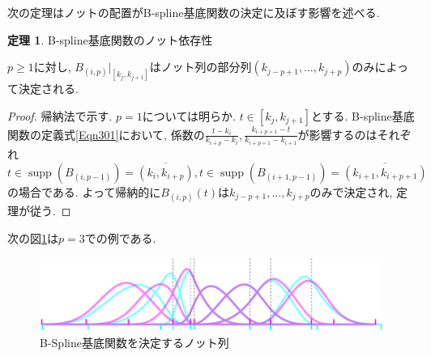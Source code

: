 \documentclass{jsarticle}
\newcommand\Cl[1]{\overline{#1}}
\newcommand\pare[1]{(#1)}
\DeclareMathOperator{\supp}{supp}
\theoremstyle{definition}%
\newtheorem{thm}{定理}
\begin{document}
次の定理はノットの配置がB-spline基底関数の決定に及ぼす影響を述べる.
\begin{screen}
	\begin{thm}
		\label{Thm302}
		B-spline基底関数のノット依存性

		$p\ge 1$に対し, $B_{(i,p)}|_{[k_j,k_{j+1}]}$はノット列の部分列$ \pare{k_{j-p+1}, \dots ,k_{j+p}} $のみによって決定される.
	\end{thm}
\end{screen}
\begin{proof}
    帰納法で示す.
    $p=1$については明らか.
    $t\in [k_{j},k_{j+1}]$とする.
    B-spline基底関数の定義式\eqref{Eqn301}において, 係数の$\frac{t-k_{i}}{k_{i+p}-k_{i}},\frac{k_{i+p+1}-t}{k_{i+p+1}-k_{i+1}}$が影響するのはそれぞれ$t\in \supp(B_{(i,p-1)})=\Cl{(k_{i},k_{i+p})}, t\in \supp(B_{(i+1,p-1)})=\Cl{(k_{i+1},k_{i+p+1})}$の場合である.
    よって帰納的に$B_{(i,p)}(t)$は$k_{j-p+1},\dots,k_{j+p}$のみで決定され, 定理が従う.
\end{proof}
次の図\ref{Fig303}は$p=3$での例である.
\addtocounter{footnote}{-1}
\begin{figure}[H]
	\centering
    \includegraphics[page=1,clip,width=130mm]{figA.pdf}
	\caption{B-Spline基底関数を決定するノット列\protect\footnotemark}
	\label{Fig303}
\end{figure}
\end{document}
